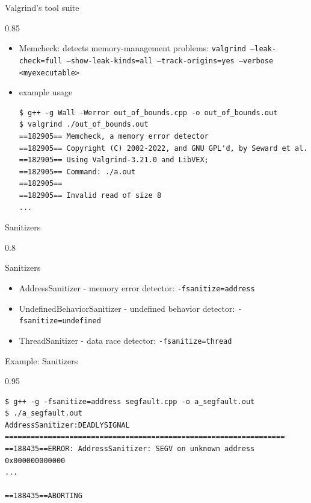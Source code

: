 \documentclass[aspectratio=1610]{beamer}
\newenvironment{centeredblock}[2][0.8\textwidth]
{ %
	\begin{center}
		\begin{varwidth}{#1} %
			\begin{block}{#2}
				\centering
			}
			{ %
			\end{block}
		\end{varwidth}
	\end{center}
}
\begin{document}
	\begin{frame}[fragile]{Valgrind's tool suite}
		\begin{centeredblock}[0.85 \textwidth]{}
			\begin{itemize}
				\item Memcheck: detects memory-management problems: \newline 
					\texttt{valgrind --leak-check=full --show-leak-kinds=all --track-origins=yes --verbose <myexecutable>}
					\item example usage
\begin{verbatim}
$ g++ -g Wall -Werror out_of_bounds.cpp -o out_of_bounds.out
$ valgrind ./out_of_bounds.out
==182905== Memcheck, a memory error detector
==182905== Copyright (C) 2002-2022, and GNU GPL'd, by Seward et al.
==182905== Using Valgrind-3.21.0 and LibVEX;
==182905== Command: ./a.out
==182905== 
==182905== Invalid read of size 8
...
\end{verbatim}
			\end{itemize}
		\end{centeredblock}
	\end{frame}
	
	\begin{frame}[fragile]{Sanitizers}
		\begin{centeredblock}{Sanitizers}
			\begin{itemize}
				\item AddressSanitizer - memory error detector: \texttt{-fsanitize=address} 
				\item UndefinedBehaviorSanitizer - undefined behavior detector: \texttt{-fsanitize=undefined}
				\item ThreadSanitizer - data race detector: \texttt{-fsanitize=thread}
			\end{itemize}
		\end{centeredblock}
	
		{\def\thefootnote{}}
	\end{frame}
	
	\begin{frame}[fragile]{Example: Sanitizers}
		\begin{centeredblock}[0.95 \textwidth]{}
			\begin{verbatim}
$ g++ -g -fsanitize=address segfault.cpp -o a_segfault.out
$ ./a_segfault.out
AddressSanitizer:DEADLYSIGNAL
=================================================================
==188435==ERROR: AddressSanitizer: SEGV on unknown address 0x000000000000
...

==188435==ABORTING
			\end{verbatim}
		\end{centeredblock}
	\end{frame}
	
\end{document}
